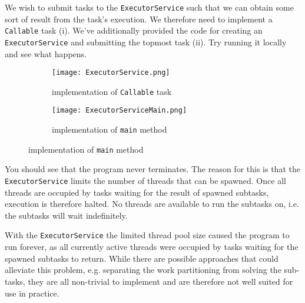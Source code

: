 \documentclass[main.tex]{subfiles}
\begin{document}
\begin{example}
\label{ex:ES_Div&Conq}
    We wish to submit tasks to the \texttt{ExecutorService} such that we can obtain some sort of result from the task's execution. We therefore need to implement a \texttt{Callable} task (i). We've additionally provided the code for creating an \texttt{ExecutorService} and submitting the topmost task (ii). Try running it locally and see what happens. 
    \begin{figure}[H]
        \centering
        \begin{subfigure}{.5\textwidth}
            \centering
            \texttt{[image: ExecutorService.png]}
            \caption{implementation of \texttt{Callable} task}
        \end{subfigure}%
        \begin{subfigure}{.5\textwidth}
            \centering
            \texttt{[image: ExecutorServiceMain.png]}
            \caption{implementation of \texttt{main} method}
        \end{subfigure}
    \end{figure}
    \noindent You should see that the program never terminates. The reason for this is that the \texttt{ExecutorService} limits the number of threads that can be spawned. Once all threads are occupied by tasks waiting for the result of spawned subtasks, execution is therefore halted. No threads are available to run the subtasks on, i.e. the subtasks will wait indefinitely.
\end{example}
With the \texttt{ExecutorService} the limited thread pool size caused the program to run forever, as all currently active threads were occupied by tasks waiting for the spawned subtasks to return. While there are possible approaches that could alleviate this problem, e.g. separating the work partitioning from solving the sub-tasks, they are all non-trivial to implement and are therefore not well suited for use in practice.

\end{document}
